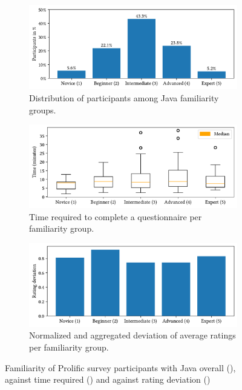 \documentclass[%
class=scrreprt,
chapterprefix=false,%
open=right,%
twoside=true,%
paper=a4,%
logofile={Logo\_zentral\_farbig\_EN.png},%
thesistype=master,%
UKenglish,%
]{se2thesis}
\theoremstyle{definition}
\begin{document}
	\begin{figure}[p]
		\centering
		\begin{subfigure}{\linewidth}
			\centering
			\includegraphics[width=\textwidth]{img/survey_java_familiarity_bar.pdf}
			\caption{Distribution of participants among Java familiarity groups.}
			\label{fig:survey_Java_familiarity_pie}
		\end{subfigure}
		\hfill
		\begin{subfigure}{\textwidth}
			\includegraphics[width=\textwidth]{img/java_knowledge_time.pdf}
			\caption{Time required to complete a questionnaire per familiarity group.}
			\label{fig:java_knowledge_time}
		\end{subfigure}
		\hfill
		\begin{subfigure}{\textwidth}
			\includegraphics[width=\textwidth]{img/java_knowledge_ratings.pdf}
			\caption{Normalized and aggregated deviation of average ratings per familiarity group.}
			\label{fig:java_knowledge_ratings}
		\end{subfigure}
		\caption{Familiarity of Prolific survey participants with Java overall (), against time required () and against rating deviation ()}
		\label{fig:java_familiarity}
	\end{figure}
\end{document}
